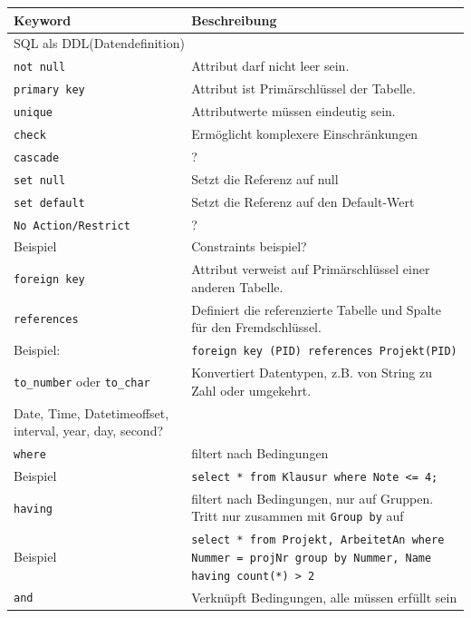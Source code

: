 \documentclass{article}
\begin{document}
\begin{center}
  \begin{longtable}{|p{4cm}|p{7cm}|}
    \hline
    \textbf{Keyword} & \textbf{Beschreibung} \\
    \hline
    \multicolumn{2}{|p{11cm}|}{SQL als DDL(Datendefinition)} \\
    \hline
    \texttt{not null} & Attribut darf nicht leer sein. \\
    \hline
    \texttt{primary key} & Attribut ist Primärschlüssel der Tabelle. \\
    \hline
    \texttt{unique} & Attributwerte müssen eindeutig sein. \\
    \hline
    \texttt{check} & Ermöglicht komplexere Einschränkungen \\
    \hline
    \texttt{cascade} & ? \\
    \hline
    \texttt{set null} & Setzt die Referenz auf null \\
    \hline
    \texttt{set default} & Setzt die Referenz auf den Default-Wert \\
    \hline
    \texttt{No Action/Restrict} & ? \\
    \hline
    Beispiel & Constraints beispiel? \\
    \hline
    \texttt{foreign key} & Attribut verweist auf Primärschlüssel einer anderen Tabelle. \\
    \hline
    \texttt{references} & Definiert die referenzierte Tabelle und Spalte für den Fremdschlüssel. \\
    \hline
    Beispiel: & \texttt{foreign key (PID) references Projekt(PID)} \\
    \hline
    \texttt{to\_number} oder \texttt{to\_char} & Konvertiert Datentypen, z.B. von String zu Zahl oder umgekehrt. \\
    \hline
    Date, Time, Datetimeoffset, interval, year, day, second? & \\
    \hline
    \texttt{where} & filtert nach Bedingungen \\
    \hline
    Beispiel & \texttt{select * from Klausur where Note <= 4;} \\
    \hline
    \texttt{having} & filtert nach Bedingungen, nur auf Gruppen. Tritt nur zusammen mit \texttt{Group by} auf \\
    \hline
    Beispiel & \texttt{select * from Projekt, ArbeitetAn where Nummer = projNr group by Nummer, Name having count(*) > 2} \\
    \hline
    \texttt{and} & Verknüpft Bedingungen, alle müssen erfüllt sein \\

\end{longtable}
\end{center}
\end{document}
